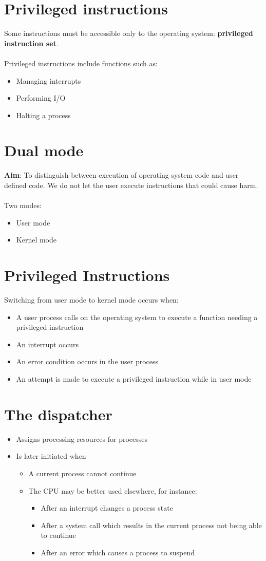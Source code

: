 \documentclass{article}[18pt]
\begin{document}
\section{Privileged instructions}
Some instructions must be accessible only to the operating system: \textbf{privileged instruction set}.\\
\\
Privileged instructions include functions such as:
\begin{itemize}
	\item Managing interrupts 
	\item Performing I/O
	\item Halting a process
\end{itemize}
\section{Dual mode}
\textbf{Aim}: To distinguish between execution of operating system code and user defined code. We do not let the user execute instructions that could cause harm.\\
\\
Two modes:
\begin{itemize}
	\item User mode
	\item Kernel mode
\end{itemize}
\section{Privileged Instructions}
Switching from user mode to kernel mode occurs when:
\begin{itemize}
	\item A user process calls on the operating system to execute a function needing a privileged instruction
	\item An interrupt occurs
	\item An error condition occurs in the user process
	\item An attempt is made to execute a privileged instruction while in user mode
\end{itemize}
\section{The dispatcher}
\begin{itemize}
	\item Assigns processing resources for processes
	\item Is later initiated when
	\begin{itemize}
		\item A current process cannot continue
		\item The CPU may be better used elsewhere, for instance:
		\begin{itemize}
			\item After an interrupt changes a process state
			\item After a system call which results in the current process not being able to continue
			\item After an error which causes a process to suspend
		\end{itemize}
	\end{itemize}
\end{itemize}
\end{document}
